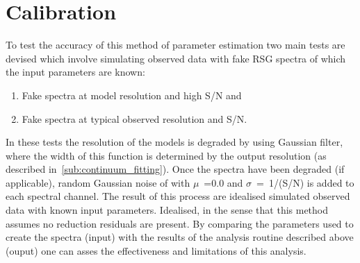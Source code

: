 


\section{Calibration} %
\label{sec:calibration}


To test the accuracy of this method of parameter estimation two main tests are devised which involve simulating observed data with fake RSG spectra of which the input parameters are known:

\begin{enumerate}
    \item Fake spectra at model resolution and high S/N and
    \item Fake spectra at typical observed resolution and S/N.
\end{enumerate}

In these tests the resolution of the models is degraded by using Gaussian filter, where the width of this function is determined by the output resolution (as described in~\ref{sub:continuum_fitting}).
Once the spectra have been degraded (if applicable), random Gaussian noise of with $\mu$~=0.0 and $\sigma$~=~1/(S/N) is added to each spectral channel.
The result of this process are idealised simulated observed data with known input parameters.
Idealised, in the sense that this method assumes no reduction residuals are present.
By comparing the parameters used to create the spectra (input) with the results of the analysis routine described above (ouput) one can asses the effectiveness and limitations of this analysis.

